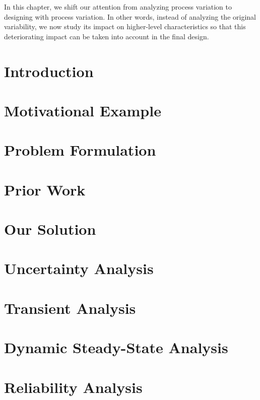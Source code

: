 In this chapter, we shift our attention from analyzing process variation to
designing with process variation. In other words, instead of analyzing the
original variability, we now study its impact on higher-level characteristics so
that this deteriorating impact can be taken into account in the final design.

\section{Introduction}

\section{Motivational Example}

\section{Problem Formulation}

\section{Prior Work}

\section{Our Solution}

\section{Uncertainty Analysis}

\section{Transient Analysis}

\section{Dynamic Steady-State Analysis}

\section{Reliability Analysis}

